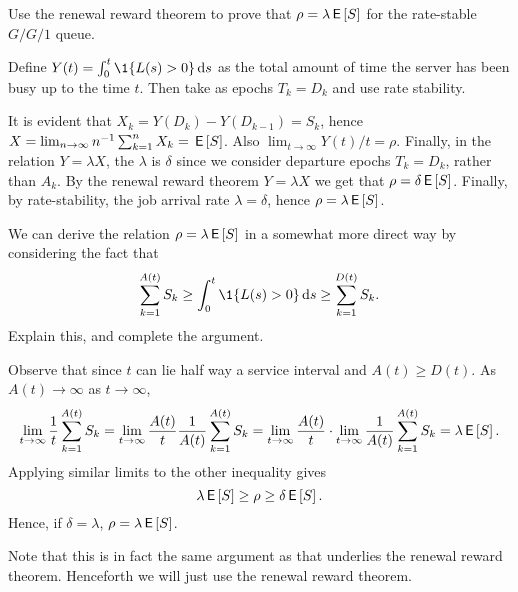 \begin{exercise}
Use the renewal reward theorem to prove that $\rho = \lambda \,\mathsf{E}\left[S\right]$ for the rate-stable $G/G/1$ queue. 
\begin{hint}
 Define $Y(t) = \int_0^t \1{L(s)>0} \d s$ as the total amount of time the server has been busy up to the time $t$.
 Then take as epochs $T_k = D_k$ and use rate stability.
\end{hint}
\begin{solution}
 It is evident that $X_k = Y(D_k)-Y(D_{k-1})=S_k$, hence $X = \lim_{n\to\infty} n^{-1}\sum_{k=1}^n X_k = \,\mathsf{E}\left[S\right]$.
 Also $\lim_{t\to\infty} Y(t)/t=\rho$.
 Finally, in the relation $Y = \lambda X$, the $\lambda$ is $\delta$ since we consider departure epochs $T_k = D_k$, rather than $A_k$.
 By the renewal reward theorem $Y=\lambda X$ we get that $\rho = \delta \,\mathsf{E}\left[S\right]$.
 Finally, by rate-stability, the job arrival rate $\lambda = \delta$, hence $\rho = \lambda \,\mathsf{E}\left[S\right]$.
\end{solution}
\end{exercise}


\begin{exercise}
 We can derive the relation $\rho = \lambda \,\mathsf{E}\left[S\right]$ in a somewhat more direct way by considering the fact that
\begin{equation*}
 \sum_{k=1}^{A(t)} S_k \geq \int_0^t \1{L(s)>0} \d s \geq \sum_{k=1}^{D(t)} S_k.
\end{equation*}
Explain this, and complete the argument.
\begin{solution}
Observe that
since $t$ can lie half way a service interval and $A(t) \geq D(t)$. As
$A(t)\to \infty$ as $t\to\infty$,
\begin{equation*}
 \lim_{t\to\infty} \frac 1 t\sum_{k=1}^{A(t)} S_k = 
 \lim_{t\to\infty} \frac{A(t)}t \frac{1}{A(t)} \sum_{k=1}^{A(t)} S_k = 
 \lim_{t\to\infty} \frac{A(t)}t \cdot \lim_{t\to\infty}\frac{1}{A(t)} \sum_{k=1}^{A(t)} S_k = \lambda \,\mathsf{E}\left[S\right].
\end{equation*}
Applying similar limits to the other inequality gives
\begin{equation*}
\lambda \,\mathsf{E}\left[S\right] \geq \rho \geq \delta \,\mathsf{E}\left[S\right].
\end{equation*}
Hence, if $\delta=\lambda$, $\rho = \lambda \,\mathsf{E}\left[S\right]$. 

Note that this is in fact the same argument as that underlies the renewal reward theorem. Henceforth we will just use the renewal reward theorem. 
\end{solution}
\end{exercise}


